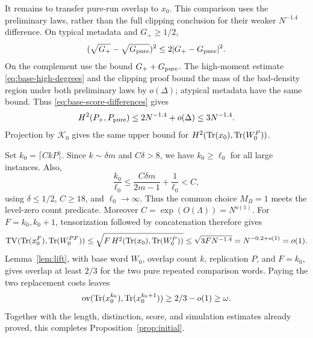 It remains to transfer pure-run overlap to \(x_0\). This comparison uses the preliminary laws, rather than the full clipping conclusion for their weaker \(N^{-1.4}\) difference. On typical metadata and \(G_+\ge1/2\),
\[
 (\sqrt{G_+}-\sqrt{G_{\rm pure}})^2
 \le 2|G_+-G_{\rm pure}|^2.
\]
On the complement use the bound \(G_++G_{\rm pure}\). The high-moment estimate \eqref{eq:base-high-degrees} and the clipping proof bound the mass of the bad-density region under both preliminary laws by \(o(\Delta)\); atypical metadata have the same bound. Thus \eqref{eq:base-score-differences} gives
\[
 H^2(P_+,P_{\rm pure})\le2N^{-1.4}+o(\Delta)\le3N^{-1.4}.
\]
Projection by \(\mathcal K_0\) gives the same upper bound for
\(H^2(\mathrm{Tr}(x_0),\mathrm{Tr}(W_0^P))\).

Set \(k_0=\lceil CkP\rceil\). Since \(k\sim\delta m\) and
\(C\delta>8\), we have \(k_0\ge\ell_0\) for all large instances. Also,
\[
 \frac{k_0}{\ell_0}
 \le\frac{C\delta m}{2m-1}+\frac1{\ell_0}<C,
\]
using \(\delta\le1/2\), \(C\ge18\), and \(\ell_0\to\infty\). Thus the common choice \(M_B=1\) meets the level-zero count predicate. Moreover
\(C=\exp(O(\Lambda))=N^{o(1)}\). For \(F=k_0,k_0+1\), tensorization followed by concatenation therefore gives
\[
 \operatorname{TV}(\mathrm{Tr}(x_0^F),\mathrm{Tr}(W_0^{PF}))
 \le\sqrt{F\,H^2(\mathrm{Tr}(x_0),\mathrm{Tr}(W_0^P))}
 \le\sqrt{3F N^{-1.4}}
 =N^{-0.2+o(1)}=o(1).
\]
Lemma~\ref{lem:lift}, with base word \(W_0\), overlap count \(k\), replication \(P\), and \(F=k_0\), gives overlap at least \(2/3\) for the two pure repeated comparison words. Paying the two replacement costs leaves
\[
 \operatorname{ov}(\mathrm{Tr}(x_0^{k_0}),\mathrm{Tr}(x_0^{k_0+1}))
 \ge2/3-o(1)\ge\omega.
\]
Together with the length, distinction, score, and simulation estimates already proved, this completes Proposition~\ref{prop:initial}.
